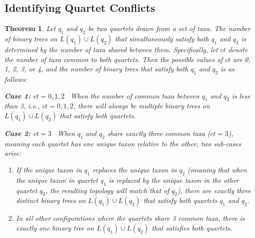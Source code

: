 \documentclass[10pt,a4paper]{article}
\newtheorem{theorem}{Theorem}[section]
\begin{document}


% 



\appendix

\renewcommand{\thefigure}{A\arabic{figure}}
\renewcommand{\thetable}{A\arabic{table}}
\renewcommand{\thesection}{A\arabic{section}}
\setcounter{figure}{0} 
\setcounter{table}{0}
\setcounter{section}{0}

\begin{appendices}

\clearpage
\section{Identifying Quartet Conflicts}
\label{app:quartet-conflict-theory}


\begin{theorem} 
\label{thm:conflict}
Let $q_1$ and $q_2$ be two quartets drawn from a set of taxa. The number of binary trees on $L(q_1) \cup L(q_2)$ that simultaneously satisfy both $q_1$ and $q_2$ is determined by the number of taxa shared between them. Specifically, let $ct$ denote the number of taxa common to both quartets. Then the possible values of $ct$ are 0, 1, 2, 3, or 4, and the number of binary trees that satisfy both $q_1$ and $q_2$ is as follows: 


\textbf{Case 1: $ct = 0, 1, 2$} \ When the number of common taxa between $q_1$ and $q_2$ is less than 3, i.e., $ct = 0, 1, 2$, there will always be multiple binary trees on $L(q_1) \cup L(q_2)$ that satisfy both quartets.

\textbf{Case 2: $ct = 3$} \ When $q_1$ and $q_2$ share exactly three common taxa ($ct = 3$), meaning each quartet has one unique taxon relative to the other, two sub-cases arise: 
    \begin{enumerate} 
        \item If the unique taxon in $q_1$ replaces the unique taxon in $q_2$ (meaning that when the unique taxon in quartet $q_1$ is replaced by the unique taxon in the other quartet $q_2$, the resulting topology will match that of $q_2$), there are exactly three distinct binary trees on $L(q_1) \cup L(q_2)$ that satisfy both quartets $q_1$ and $q_2$.
        \item In all other configurations where the quartets share 3 common taxa, there is exactly one binary tree on $L(q_1) \cup L(q_2)$ that satisfies both quartets. 
    \end{enumerate}


\end{theorem}
\end{appendices}
\end{document}
